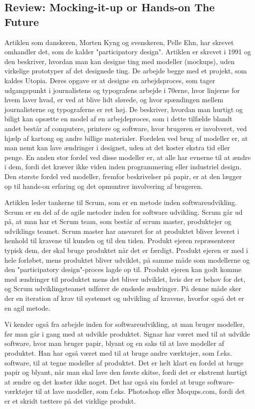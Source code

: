 \documentclass[a4paper,12pt]{article}
\begin{document}
\subsection{Review: Mocking-it-up or Hands-on The Future}
Artiklen som danskeren, Morten Kyng og svenskeren, Pelle Ehn, har skrevet omhandler det, som de kalder "participatory design". Artiklen er skrevet i 1991 og den beskriver, hvordan man kan designe ting med modeller (mockups), uden virkelige prototyper af det designede ting. De arbejde begge med et projekt, som kaldes Utopia. Deres opgave er at designe en arbejdsproces, som tager udgangspunkt i journalistens og typografens arbejde i 70erne, hvor linjerne for hvem laver hvad, er ved at blive lidt slørede, og hvor spændingen mellem journalisterne og typograferne er ret høj. De beskriver, hvordan man hurtigt og biligt kan opsætte en model af en arbejdeproces, som i dette tilfælde blandt andet består af computere, printere og software, hvor brugeren er involveret, ved hjælp af kartong og andre billige materialer. Fordelen ved brug af modeller er, at man nemt kan lave ændringer i designet, uden at det koster ekstra tid eller penge. En anden stor fordel ved disse modeller er, at alle har evnerne til at ændre i dem, fordi det kræver ikke viden inden programmering eller industriel design. Den største fordel ved modeller, fremfor beskrivelser på papir, er at den lægger op til hands-on erfaring og det opmuntrer involvering af brugeren.

Artiklen leder tankerne til Scrum, som er en metode inden softwareudvikling. Scrum er en del af de agile metoder inden for software udvikling. Scrum går ud på, at man har et Scrum team, som består af scrum master, produktejer og udviklings teamet. Scrum master har ansvaret for at produktet bliver leveret i henhold til kravene til kunden og til den tiden. Produkt ejeren repræsenterer typisk dem, der skal bruge produktet når det er færdigt. Produkt ejeren er med i hele forløbet, mens produktet bliver udviklet, på samme måde som modellerne og den "participatory design"-proces lagde op til. Produkt ejeren kan godt komme med ændringer til produktet mens det bliver udviklet, hvis der er behov for det, og Scrum udviklingsteamet udfører de ønskede ændringer. På denne måde sker der en iteration af krav til systemet og udvikling af kravene, hvorfor også det er en agil metode.

Vi kender også fra arbejde inden for softwareudvikling, at man bruger modeller, før man går i gang med at udvikle produktet. Signar har været med til at udvikle software, hvor man bruger papir, blyant og en saks til at lave modeller af produktet. Han har også været med til at bruge andre værktøjer, som f.eks. software, til at tegne modeller af produktet. Det er helt klart en fordel at bruge papir og blyant, når man skal lave den første skitse, fordi det er ekstremt hurtigt at ændre og det koster ikke noget. Det har også sin fordel at bruge software-værktøjer til at lave modeller, som f.eks. Photoshop eller Moqups.com, fordi det er et skridt tættere på det virklige produkt.
\end{document}
